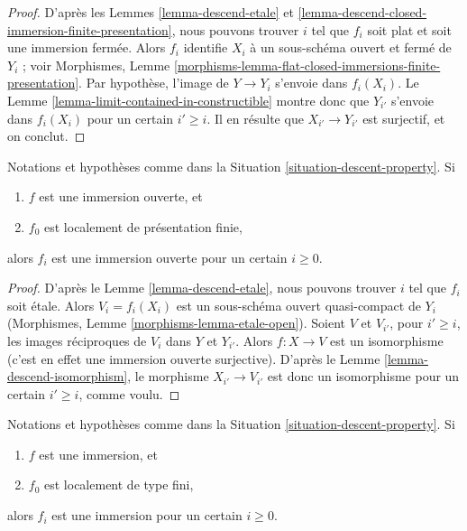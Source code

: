 \begin{proof}
D'après les Lemmes \ref{lemma-descend-etale} et
\ref{lemma-descend-closed-immersion-finite-presentation}, nous pouvons
trouver $i$ tel que $f_i$ soit plat et soit une immersion fermée. Alors $f_i$
identifie $X_i$ à un sous-schéma ouvert et fermé de $Y_i$ ; voir Morphismes,
Lemme \ref{morphisms-lemma-flat-closed-immersions-finite-presentation}. Par
hypothèse, l'image de $Y \to Y_i$ s'envoie dans $f_i(X_i)$. Le
Lemme \ref{lemma-limit-contained-in-constructible} montre donc que $Y_{i'}$
s'envoie dans $f_i(X_i)$ pour un certain $i' \geq i$. Il en résulte que
$X_{i'} \to Y_{i'}$ est surjectif, et on conclut.
\end{proof}

\begin{lemma}
\label{lemma-descend-open-immersion}
Notations et hypothèses comme dans la
Situation \ref{situation-descent-property}. Si
\begin{enumerate}
\item $f$ est une immersion ouverte, et
\item $f_0$ est localement de présentation finie,
\end{enumerate}
alors $f_i$ est une immersion ouverte pour un certain $i \geq 0$.
\end{lemma}

\begin{proof}
D'après le Lemme \ref{lemma-descend-etale}, nous pouvons trouver $i$ tel que
$f_i$ soit \'etale. Alors $V_i = f_i(X_i)$ est un sous-schéma ouvert
quasi-compact de $Y_i$ (Morphismes,
Lemme \ref{morphisms-lemma-etale-open}). Soient $V$ et $V_{i'}$, pour
$i' \geq i$, les images réciproques de $V_i$ dans $Y$ et $Y_{i'}$. Alors
$f : X \to V$ est un isomorphisme (c'est en effet une immersion ouverte
surjective). D'après le Lemme \ref{lemma-descend-isomorphism}, le morphisme
$X_{i'} \to V_{i'}$ est donc un isomorphisme pour un certain $i' \geq i$,
comme voulu.
\end{proof}

\begin{lemma}
\label{lemma-descend-immersion}
Notations et hypothèses comme dans la
Situation \ref{situation-descent-property}. Si
\begin{enumerate}
\item $f$ est une immersion, et
\item $f_0$ est localement de type fini,
\end{enumerate}
alors $f_i$ est une immersion pour un certain $i \geq 0$.
\end{lemma}

